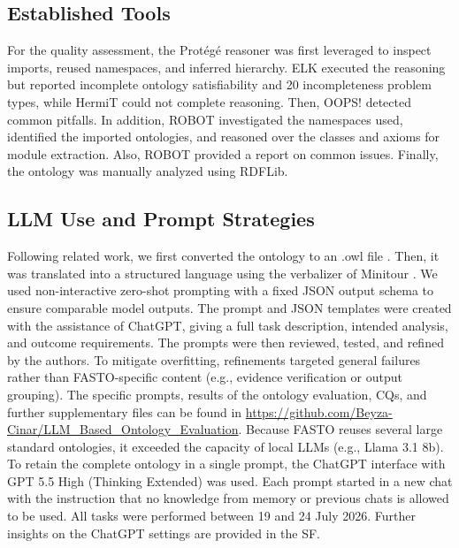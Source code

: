 \documentclass[
]{ceurart}
\begin{document}
\subsection{Established Tools}

For the quality assessment, the Protégé reasoner was first leveraged to inspect imports, reused namespaces, and inferred hierarchy. ELK executed the reasoning but reported incomplete ontology satisfiability and 20 incompleteness problem types, while HermiT could not complete reasoning. Then, OOPS! detected common pitfalls. In addition, ROBOT investigated the namespaces used, identified the imported ontologies, and reasoned over the classes and axioms for module extraction. Also, ROBOT provided a report on common issues. Finally, the ontology was manually analyzed using RDFLib. 

\subsection{LLM Use and Prompt Strategies}

Following related work, we first converted the ontology to an .owl file \cite{Sowiski2022}. Then, it was translated into a structured language using the verbalizer of Minitour \cite{zaitoun2024_NLfromOWL}. We used non-interactive zero-shot prompting with a fixed JSON output schema to ensure comparable model outputs. The prompt and JSON templates were created with the assistance of ChatGPT, giving a full task description, intended analysis, and outcome requirements. The prompts were then reviewed, tested, and refined by the authors. To mitigate overfitting, refinements targeted general failures rather than FASTO-specific content (e.g., evidence verification or output grouping).
The specific prompts, results of the ontology evaluation, CQs, and further supplementary files can be found in \href{https://github.com/Beyza-Cinar/LLM_Based_Ontology_Evaluation}{https://github.com/Beyza-Cinar/LLM\_Based\_Ontology\_Evaluation}. Because FASTO reuses several large standard ontologies, it exceeded the capacity of local LLMs (e.g., Llama 3.1 8b). To retain the complete ontology in a single prompt, the ChatGPT interface with GPT 5.5 High (Thinking Extended) was used. Each prompt started in a new chat with the instruction that no knowledge from memory or previous chats is allowed to be used. All tasks were performed between 19 and 24 July 2026. Further insights on the ChatGPT settings are provided in the SF. 
\end{document}
